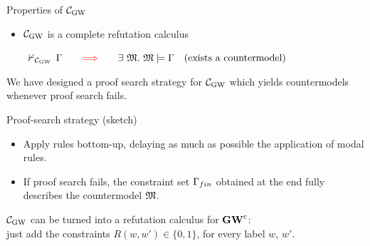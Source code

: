 \begin{frame}{Properties of $\mathcal{C}_{\mathrm{GW}}$}



  \begin{itemize}


\item[(3)] 
$\mathcal{C}_{\mathrm{GW}}$ is a   {\red  complete} refutation calculus


  \begin{center}
    \begin{tcolorbox}[colframe=blue!75!black,width=30em]
       \center
  $
{}\,\nvdash_{\mathcal{C}_{\mathrm{GW}}}\, \Gamma
\qquad{\color{red}\Longrightarrow}\qquad
\exists\ \mathfrak{M}.\ \mathfrak{M}\models \Gamma
\quad\text{(exists a countermodel)}
$
 \end{tcolorbox}
\end{center}




\end{itemize}

\MP

We have designed a {\red proof search strategy} for $\mathcal{C}_{\mathrm{GW}}$ which yields  {\red countermodels}
whenever proof search fails.

\medskip

\begin{tcgreenbox}[top=0ex]{Proof-search strategy (sketch)}
  \begin{itemize}
  \item[$\surd$] Apply rules bottom-up, delaying as much as possible the application of modal rules.


    \smallskip
  \item[$\surd$]  If proof search fails, the  constraint set $\Gamma_{fin}$ obtained at the end
    fully describes the countermodel $\mathfrak{M}$.
  \end{itemize}
 \end{tcgreenbox}


 \bigskip

 \smallskip
  $\mathcal{C}_{\mathrm{GW}}$ can be  turned into a   refutation calculus for $\mathbf{GW}^\mathrm{c}$:\\
   just add the constraints  $R(w,w')\in \{0,1\}$, for every label $w$, $w'$.
 

  \VFILL
\end{frame}

